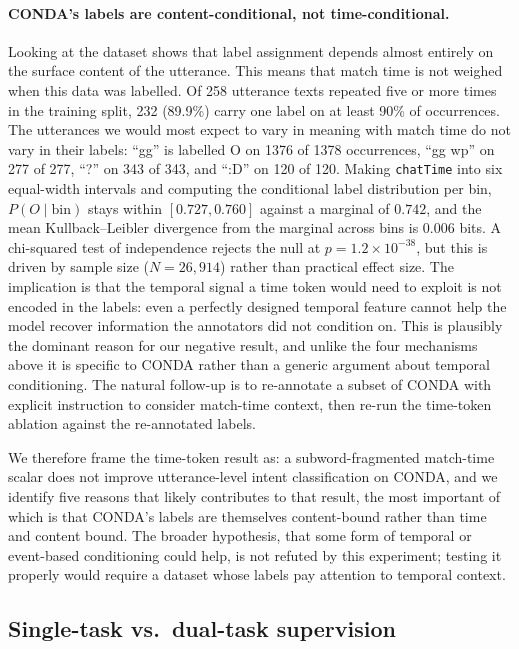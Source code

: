 \documentclass[a4paper,10.5pt,twoside]{article}
\begin{document}
\paragraph{CONDA's labels are content-conditional, not time-conditional.} Looking at the dataset shows that label assignment depends almost entirely on the surface content of the utterance. This means that match time is not weighed when this data was labelled. Of 258 utterance texts repeated five or more times in the training split, 232 (89.9\%) carry one label on at least 90\% of occurrences. The utterances we would most expect to vary in meaning with match time do not vary in their labels: ``gg'' is labelled O on 1376 of 1378 occurrences, ``gg wp'' on 277 of 277, ``?'' on 343 of 343, and ``:D'' on 120 of 120. Making \texttt{chatTime} into six equal-width intervals and computing the conditional label distribution per bin, $P(O \mid \text{bin})$ stays within $[0.727, 0.760]$ against a marginal of $0.742$, and the mean Kullback--Leibler divergence from the marginal across bins is $0.006$ bits. A chi-squared test of independence rejects the null at $p = 1.2 \times 10^{-38}$, but this is driven by sample size ($N = 26{,}914$) rather than practical effect size. The implication is that the temporal signal a time token would need to exploit is not encoded in the labels: even a perfectly designed temporal feature cannot help the model recover information the annotators did not condition on. This is plausibly the dominant reason for our negative result, and unlike the four mechanisms above it is specific to CONDA rather than a generic argument about temporal conditioning. The natural follow-up is to re-annotate a subset of CONDA with explicit instruction to consider match-time context, then re-run the time-token ablation against the re-annotated labels.

We therefore frame the time-token result as: a subword-fragmented match-time scalar does not improve utterance-level intent classification on CONDA, and we identify five reasons that likely contributes to that result, the most important of which is that CONDA's labels are themselves content-bound rather than time and content bound. The broader hypothesis, that some form of temporal or event-based conditioning could help, is not refuted by this experiment; testing it properly would require a dataset whose labels pay attention to temporal context.

\subsection{Single-task vs.\ dual-task supervision}
\end{document}
